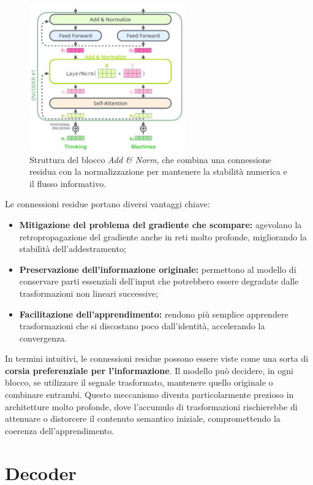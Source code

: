\begin{figure}[hbtp]
    \centering
    \includegraphics[width=0.6\textwidth]{figure/ResidualAddon.png}
    \caption{Struttura del blocco \textit{Add \& Norm}, che combina una connessione residua con la normalizzazione per mantenere la stabilità numerica e il flusso informativo.}
    \label{fig:ResAddon}
\end{figure}
Le connessioni residue portano diversi vantaggi chiave:
\begin{itemize}
    \item \textbf{Mitigazione del problema del gradiente che scompare:} agevolano la retropropagazione del gradiente anche in reti molto profonde, migliorando la stabilità dell’addestramento;
    \item \textbf{Preservazione dell’informazione originale:} permettono al modello di conservare parti essenziali dell’input che potrebbero essere degradate dalle trasformazioni non lineari successive;
    \item \textbf{Facilitazione dell’apprendimento:} rendono più semplice apprendere trasformazioni che si discostano poco dall’identità, accelerando la convergenza.
\end{itemize}
In termini intuitivi, le connessioni residue possono essere viste come una sorta di \textbf{corsia preferenziale per l’informazione}. Il modello può decidere, in ogni blocco, se utilizzare il segnale trasformato, mantenere quello originale o combinare entrambi. Questo meccanismo diventa particolarmente prezioso in architetture molto profonde, dove l’accumulo di trasformazioni rischierebbe di attenuare o distorcere il contenuto semantico iniziale, compromettendo la coerenza dell’apprendimento.

\section{Decoder}

